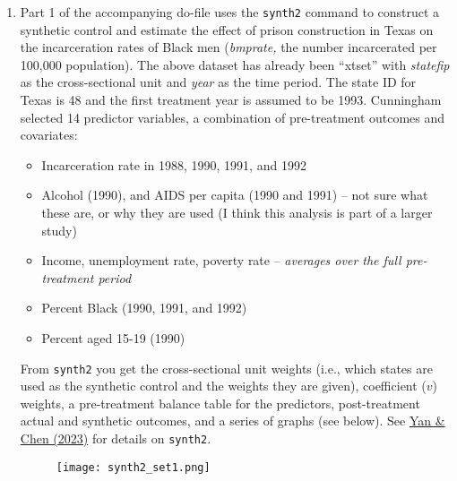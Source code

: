 \documentclass[12pt]{article}
\begin{document}
\begin{enumerate}
\setlength\itemsep{1em}

\item Part 1 of the accompanying do-file uses the \texttt{synth2} command to construct a synthetic control and estimate the effect of prison construction in Texas on the incarceration rates of Black men (\textit{bmprate,} the number incarcerated per 100,000 population). The above dataset has already been ``xtset'' with \textit{statefip} as the cross-sectional unit and \textit{year} as the time period. The state ID for Texas is 48 and the first treatment year is assumed to be 1993. Cunningham selected 14 predictor variables, a combination of pre-treatment outcomes and covariates:

\begin{itemize}
\item[] Incarceration rate in 1988, 1990, 1991, and 1992
\item[] Alcohol (1990), and AIDS per capita (1990 and 1991) -- not sure what these are, or why they are used (I think this analysis is part of a larger study)
\item[] Income, unemployment rate, poverty rate -- \textit{averages over the full pre-treatment period}
\item[] Percent Black (1990, 1991, and 1992)
\item[] Percent aged 15-19 (1990)
\end{itemize}

From \texttt{synth2} you get the cross-sectional unit weights (i.e., which states are used as the synthetic control and the weights they are given), coefficient ($v$) weights, a pre-treatment balance table for the predictors, post-treatment actual and synthetic outcomes, and a series of graphs (see below). See \href{https://journals.sagepub.com/doi/10.1177/1536867X231195278}{Yan \& Chen (2023)} for details on \texttt{synth2}.

\begin{figure}[h]
\begin{center}
\texttt{[image: synth2\_set1.png]}
\end{center}
\end{figure}


\end{enumerate}
\end{document}
